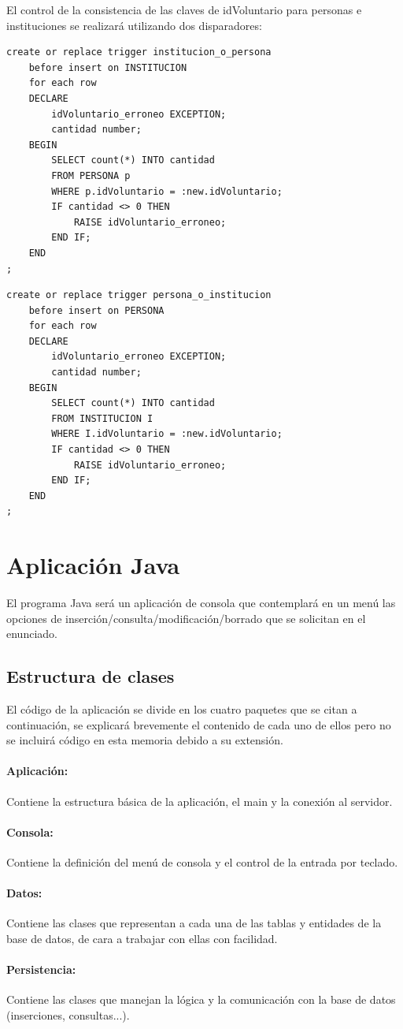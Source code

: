 \documentclass[11pt]{article}
\begin{document}
El control de la consistencia de las claves de idVoluntario para personas e instituciones se realizará utilizando dos disparadores:

\begin{lstlisting}[style=SQL]
create or replace trigger institucion_o_persona 
	before insert on INSTITUCION
	for each row
	DECLARE
		idVoluntario_erroneo EXCEPTION;
		cantidad number;
	BEGIN
		SELECT count(*) INTO cantidad
		FROM PERSONA p
		WHERE p.idVoluntario = :new.idVoluntario;
		IF cantidad <> 0 THEN
			RAISE idVoluntario_erroneo;
		END IF;	
	END
;
\end{lstlisting} 

\begin{lstlisting}[style=SQL]
create or replace trigger persona_o_institucion
	before insert on PERSONA
	for each row
	DECLARE
		idVoluntario_erroneo EXCEPTION;
		cantidad number;
	BEGIN
		SELECT count(*) INTO cantidad
		FROM INSTITUCION I
		WHERE I.idVoluntario = :new.idVoluntario;
		IF cantidad <> 0 THEN
			RAISE idVoluntario_erroneo;
		END IF;	
	END
;
\end{lstlisting} 

\section{Aplicación Java}
El programa Java será un aplicación de consola que contemplará en un menú las opciones de inserción/consulta/modificación/borrado que se solicitan en el enunciado.

\subsection{Estructura de clases}
El código de la aplicación se divide en los cuatro paquetes que se citan a continuación, se explicará brevemente el contenido de cada uno de ellos pero no se incluirá código en esta memoria debido a su extensión.

\paragraph{Aplicación: }
Contiene la estructura básica de la aplicación, el main y la conexión al servidor.

\paragraph{Consola: }
Contiene la definición del menú de consola y el control de la entrada por teclado.

\paragraph{Datos: }
Contiene las clases que representan a cada una de las tablas y entidades de la base de datos, de cara a trabajar con ellas con facilidad.

\paragraph{Persistencia: }
Contiene las clases que manejan la lógica y la comunicación con la base de datos (inserciones, consultas...).  
\end{document}

